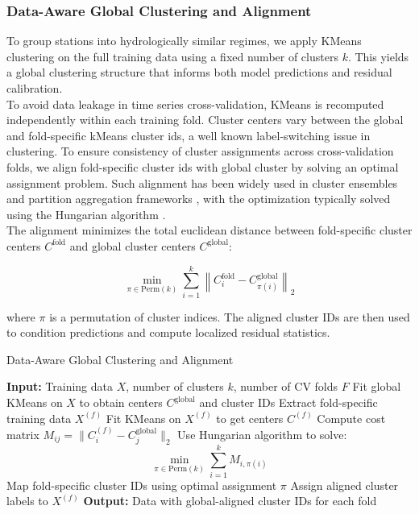 \documentclass[ruler]{CUP-JNL-EDS}%
\begin{document}
\subsubsection*{Data-Aware Global Clustering and Alignment }
To group stations into hydrologically similar regimes, we apply KMeans clustering on the full training data using a 
fixed number of clusters \( k \). This yields a global clustering structure that informs both model predictions and 
residual calibration.\\
To avoid data leakage in time series cross-validation, KMeans is recomputed independently within each training fold. 
Cluster centers vary between the global and fold-specific kMeans cluster ids, a well known label-switching issue in clustering. 
To ensure consistency of cluster assignments across cross-validation folds, we align fold-specific cluster ids with 
global cluster by solving an optimal assignment problem. Such alignment has been widely used in cluster ensembles and partition 
aggregation frameworks \citep{stephen2000, strehl2003}, with the optimization typically solved using the 
Hungarian algorithm \citep{kuhn1955}.\\

The alignment minimizes the total euclidean distance between fold-specific cluster centers 
\( C^{\text{fold}} \) and global cluster centers \( C^{\text{global}} \):

\begin{equation}
\min_{\pi \in \text{Perm}(k)} \sum_{i=1}^{k} \left\| C^{\text{fold}}_i - C^{\text{global}}_{\pi(i)} \right\|_2
\end{equation}

where \( \pi \) is a permutation of cluster indices. The aligned cluster IDs are then used to condition predictions and compute localized residual statistics.

\begin{algorithm}[!htp]
\caption{Data-Aware Global Clustering and Alignment}
\begin{algorithmic}[1]
\State \textbf{Input:} Training data \( X \), number of clusters \( k \), number of CV folds \( F \)
\State Fit global KMeans on \( X \) to obtain centers \( C^{\text{global}} \) and cluster IDs
    \State Extract fold-specific training data \( X^{(f)} \)
    \State Fit KMeans on \( X^{(f)} \) to get centers \( C^{(f)} \)
    \State Compute cost matrix \( M_{ij} = \lVert C^{(f)}_i - C^{\text{global}}_j \rVert_2 \)
    \State Use Hungarian algorithm to solve:
    \[
        \min_{\pi \in \text{Perm}(k)} \sum_{i=1}^{k} M_{i,\pi(i)}
    \]
    \State Map fold-specific cluster IDs using optimal assignment \( \pi \)
    \State Assign aligned cluster labels to \( X^{(f)} \)
\EndFor
\State \textbf{Output:} Data with global-aligned cluster IDs for each fold
\end{algorithmic}
\end{algorithm}
\end{document}
